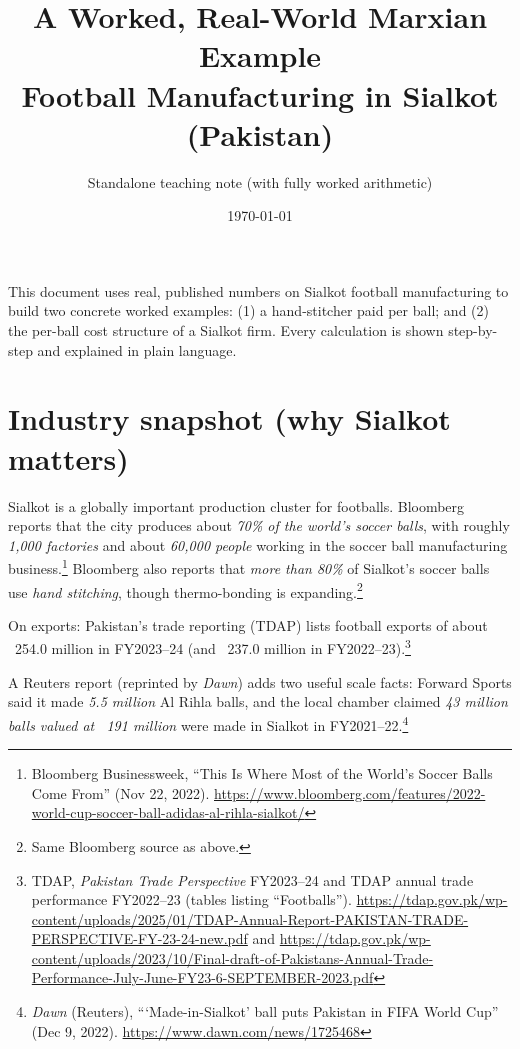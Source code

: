 \documentclass[11pt]{article}
\title{A Worked, Real-World Marxian Example\\Football Manufacturing in Sialkot (Pakistan)}
\author{Standalone teaching note (with fully worked arithmetic)}
\date{\today}
\newcommand{\USD}{\text{USD}}
\begin{document}
\maketitle

\vspace{-0.5em}
\begin{center}
\small
This document uses real, published numbers on Sialkot football manufacturing to build two concrete worked examples:
(1) a hand-stitcher paid per ball; and (2) the per-ball cost structure of a Sialkot firm.
Every calculation is shown step-by-step and explained in plain language.
\end{center}

\section{Industry snapshot (why Sialkot matters)}
Sialkot is a globally important production cluster for footballs. Bloomberg reports that the city produces about
\emph{70\% of the world’s soccer balls}, with roughly \emph{1,000 factories} and about \emph{60,000 people}
working in the soccer ball manufacturing business.\footnote{Bloomberg Businessweek, ``This Is Where Most of the World’s Soccer Balls Come From'' (Nov 22, 2022). \url{https://www.bloomberg.com/features/2022-world-cup-soccer-ball-adidas-al-rihla-sialkot/}}
Bloomberg also reports that \emph{more than 80\%} of Sialkot’s soccer balls use \emph{hand stitching}, though thermo-bonding
is expanding.\footnote{Same Bloomberg source as above.}

On exports: Pakistan’s trade reporting (TDAP) lists football exports of about \USD{}~254.0 million in FY2023--24 (and \USD{}~237.0 million in FY2022--23).\footnote{TDAP, \emph{Pakistan Trade Perspective} FY2023--24 and TDAP annual trade performance FY2022--23 (tables listing ``Footballs''). \url{https://tdap.gov.pk/wp-content/uploads/2025/01/TDAP-Annual-Report-PAKISTAN-TRADE-PERSPECTIVE-FY-23-24-new.pdf} and \url{https://tdap.gov.pk/wp-content/uploads/2023/10/Final-draft-of-Pakistans-Annual-Trade-Performance-July-June-FY23-6-SEPTEMBER-2023.pdf}}

A Reuters report (reprinted by \emph{Dawn}) adds two useful scale facts:
Forward Sports said it made \emph{5.5 million} Al Rihla balls, and the local chamber claimed
\emph{43 million balls valued at \USD{}~191 million} were made in Sialkot in FY2021--22.\footnote{\emph{Dawn} (Reuters), ``‘Made-in-Sialkot’ ball puts Pakistan in FIFA World Cup'' (Dec 9, 2022). \url{https://www.dawn.com/news/1725468}}
\end{document}
